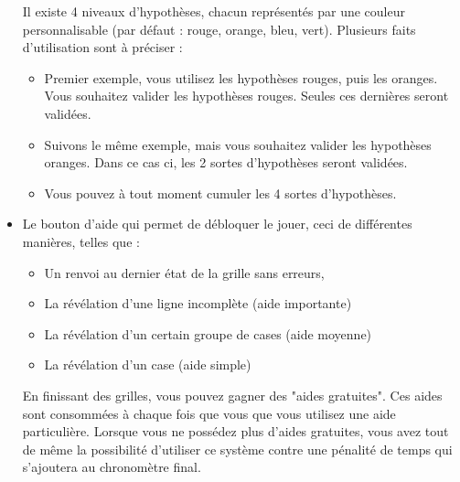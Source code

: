 \documentclass[a4paper, 12pt]{report}
\begin{document}
\begin{itemize}
                Il existe 4 niveaux d'hypothèses, chacun représentés par une couleur personnalisable (par défaut : rouge, orange, bleu, vert).
                Plusieurs faits d'utilisation sont à préciser :
                \begin{itemize}
                    \item Premier exemple, vous utilisez les hypothèses rouges, puis les oranges. Vous souhaitez valider les hypothèses rouges. Seules ces dernières seront validées.
                    \item Suivons le même exemple, mais vous souhaitez valider les hypothèses oranges. Dans ce cas ci, les 2 sortes d'hypothèses seront validées.
                    \item Vous pouvez à tout moment cumuler les 4 sortes d'hypothèses.
                \end{itemize}
                \item Le bouton d'aide qui permet de débloquer le jouer, ceci de différentes manières, telles que :
                \begin{itemize}
                    \item Un renvoi au dernier état de la grille sans erreurs,
                    \item La révélation d'une ligne incomplète (aide importante)
                    \item La révélation d'un certain groupe de cases (aide moyenne)
                    \item La révélation d'un case (aide simple)
                \end{itemize}
                En finissant des grilles, vous pouvez gagner des "aides gratuites". Ces aides sont consommées à chaque fois que vous que vous utilisez une aide particulière.
                Lorsque vous ne possédez plus d'aides gratuites, vous avez tout de même la possibilité d'utiliser ce système contre une pénalité de temps qui s'ajoutera au chronomètre final.\\
                \begin{minipage}{\linewidth}
                    \centering

\end{minipage}
\end{itemize}
\end{document}

